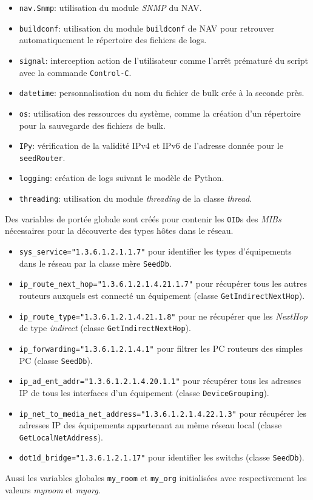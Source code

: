 \begin{itemize}
\item \texttt{nav.Snmp}: utilisation du module \emph{SNMP} du NAV.
\item \texttt{buildconf}: utilisation du module \texttt{buildconf} de NAV pour retrouver automatiquement le répertoire des fichiers de logs. 
\item \texttt{signal}: interception action de l'utilisateur comme l'arrêt prématuré du script avec la commande \texttt{Control-C}.
\item \texttt{datetime}: personnalisation du nom du fichier de bulk crée à la seconde près.
\item \texttt{os}: utilisation des ressources du système, comme la création d'un répertoire pour la sauvegarde des fichiers de bulk.
\item \texttt{IPy}: vérification de la validité IPv4 et IPv6 de l'adresse donnée pour le \texttt{seedRouter}.
\item \texttt{logging}: création de logs suivant le modèle de Python.
\item \texttt{threading}: utilisation du module \emph{threading} de la classe \emph{thread}.
\end{itemize}

Des variables de portée globale sont créés pour contenir les \texttt{OID}s des \emph{MIBs} nécessaires pour la découverte des types hôtes dans le réseau.
\begin{itemize}
\item \texttt{sys\_service="1.3.6.1.2.1.1.7"} pour identifier les types d'équipements dans le réseau par la classe mère \texttt{SeedDb}.
\item \texttt{ip\_route\_next\_hop="1.3.6.1.2.1.4.21.1.7"} pour récupérer tous les autres routeurs auxquels est connecté un équipement (classe \texttt{GetIndirectNextHop}).
\item \texttt{ip\_route\_type="1.3.6.1.2.1.4.21.1.8"} pour ne récupérer que les \emph{NextHop} de type \emph{indirect} (classe \texttt{GetIndirectNextHop}).
\item \texttt{ip\_forwarding="1.3.6.1.2.1.4.1"} pour filtrer les PC routeurs des simples PC (classe \texttt{SeedDb}).
\item \texttt{ip\_ad\_ent\_addr="1.3.6.1.2.1.4.20.1.1"} pour récupérer tous les adresses IP de tous les interfaces d'un équipement (classe \texttt{DeviceGrouping}).
\item \texttt{ip\_net\_to\_media\_net\_address="1.3.6.1.2.1.4.22.1.3"} pour récupérer les adresses IP des équipements appartenant au même réseau local (classe \texttt{GetLocalNetAddress}).
\item \texttt{dot1d\_bridge="1.3.6.1.2.1.17"} pour identifier les switchs (classe \texttt{SeedDb}).
\end{itemize}
Aussi les variables globales \texttt{my\_room} et \texttt{my\_org} initialisées avec respectivement les valeurs \emph{myroom} et \emph{myorg}.

